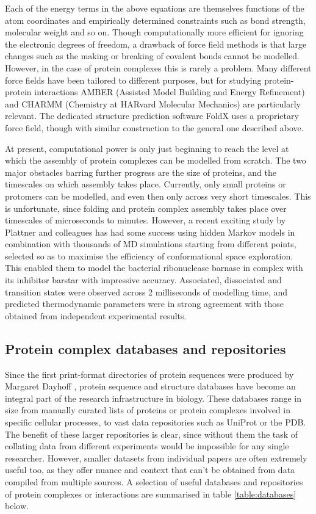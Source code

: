 \documentclass[a4paper,11pt,twoside,openright]{scrbook}
\begin{document}
Each of the energy terms in the above equations are themselves functions of the atom coordinates and empirically determined constraints such as bond strength, molecular weight and so on. Though computationally more efficient for ignoring the electronic degrees of freedom, a drawback of force field methods is that large changes such as the making or breaking of covalent bonds cannot be modelled. However, in the case of protein complexes this is rarely a problem. Many different force fields have been tailored to different purposes, but for studying protein-protein interactions AMBER \cite{Salomon-Ferrer2013,Amber2017} (Assisted Model Building and Energy Refinement) and CHARMM \cite{Brooks2009} (Chemistry at HARvard Molecular Mechanics) are particularly relevant. The dedicated structure prediction software FoldX \cite{Schymkowitz2005} uses a proprietary force field, though with similar construction to the general one described above.

At present, computational power is only just beginning to reach the level at which the assembly of protein complexes can be modelled from scratch. The two major obstacles barring further progress are the size of proteins, and the timescales on which assembly takes place. Currently, only small proteins or protomers can be modelled, and even then only across very short timescales. This is unfortunate, since folding and protein complex assembly takes place over timescales of microseconds to minutes. However, a recent exciting study by Plattner and colleagues \cite{Plattner2017} has had some success using hidden Markov models in combination with thousands of MD simulations starting from different points, selected so as to maximise the efficiency of conformational space exploration. This enabled them to model the bacterial ribonuclease barnase in complex with its inhibitor barstar with impressive accuracy. Associated, dissociated and transition states were observed across 2 milliseconds of modelling time, and predicted thermodynamic parameters were in strong agreement with those obtained from independent experimental results.

\subsection{Protein complex databases and repositories}
Since the first print-format directories of protein sequences were produced by Margaret Dayhoff \cite{Dayhoff1965}, protein sequence and structure databases have become an integral part of the research infrastructure in biology. These databases range in size from manually curated lists of proteins or protein complexes involved in specific cellular processes, to vast data repositories such as UniProt or the PDB. The benefit of these larger repositories is clear, since without them the task of collating data from different experiments would be impossible for any single researcher. However, smaller datasets from individual papers are often extremely useful too, as they offer nuance and context that can't be obtained from data compiled from multiple sources. A selection of useful databases and repositories of protein complexes or interactions are summarised in table \ref{table:databases} below.
\end{document}
